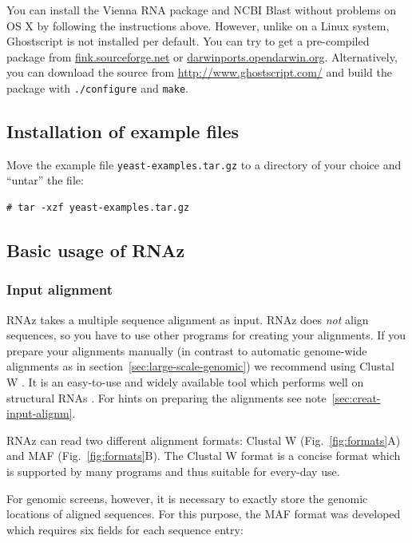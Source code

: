 \documentclass[11pt]{article}
\begin{document}
You can install the Vienna RNA package and NCBI Blast without problems
on OS X by following the instructions above. However, unlike on a
Linux system, Ghostscript is not installed per default. You can try to
get a pre-compiled package from \url{fink.sourceforge.net} or
\url{darwinports.opendarwin.org}.  Alternatively, you can download the
source from \url{http://www.ghostscript.com/} and build the package
with \texttt{./configure} and \texttt{make}.

\subsection{Installation of example files}

Move the example file \texttt{yeast-examples.tar.gz} to a directory of
your choice and ``untar'' the file:

\begin{verbatim}
# tar -xzf yeast-examples.tar.gz
\end{verbatim}

\subsection{Basic usage of RNAz}

\subsubsection{Input alignment}

RNAz takes a multiple sequence alignment as input. RNAz does
\emph{not} align sequences, so you have to use other programs for
creating your alignments. If you prepare your alignments manually (in
contrast to automatic genome-wide alignments as in
section~\ref{sec:large-scale-genomic}) we recommend using Clustal W
\cite{thompson94}. It is an easy-to-use and widely available tool
which performs well on structural RNAs \cite{gardner05}. For hints on
preparing the alignments see note~\ref{sec:creat-input-alignm}.

RNAz can read two different alignment formats: Clustal W
(Fig.~\ref{fig:formats}A) and MAF (Fig.~\ref{fig:formats}B). The
Clustal W format is a concise format which is supported by many
programs and thus suitable for every-day use.

For genomic screens, however, it is necessary to exactly store the
genomic locations of aligned sequences. For this purpose, the MAF
format was developed which requires six fields for each sequence
entry:
\end{document}
